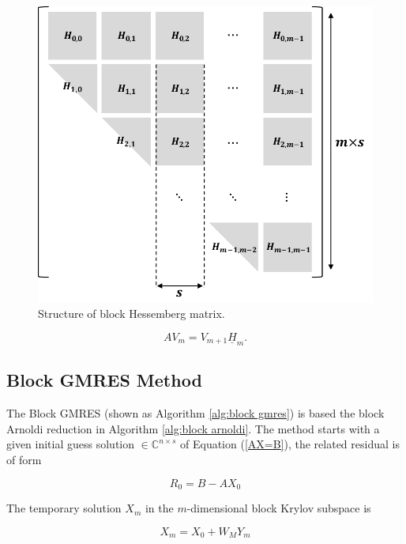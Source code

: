 \begin{figure}[htbp]
	\centering
	\includegraphics[width=5.6in]{fig/block-hessemberg.pdf}
	\caption{Structure of block Hessemberg matrix.}
	\label{fig:block-hessemberg}
\end{figure}

\begin{equation}
	AV_m=V_{m+1}\underline{H}_m.
\end{equation}
\subsection{Block GMRES Method}

The Block GMRES (shown as Algorithm \ref{alg:block gmres}) is based the block Arnoldi reduction in Algorithm \ref{alg:block arnoldi}. The method starts with a given initial guess solution $\in \mathbb{C}^{n\times s}$ of Equation (\ref{AX=B}), the related residual is of form

\begin{equation}
	R_0=B-AX_0
\end{equation}

The temporary solution $X_m$ in the $m$-dimensional block Krylov subspace is

\begin{equation}
	X_m = X_0+W_MY_m
\end{equation}

